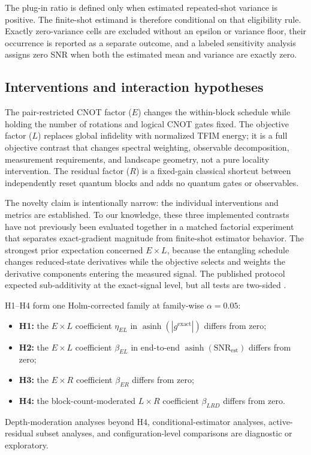 \documentclass[pdflatex,sn-basic,Numbered]{sn-jnl}
\newcommand{\snrest}{\mathrm{SNR}_{\mathrm{est}}}
\begin{document}
The plug-in ratio is defined only when estimated repeated-shot variance is positive. The finite-shot estimand is therefore conditional on that eligibility rule. Exactly zero-variance cells are excluded without an epsilon or variance floor, their occurrence is reported as a separate outcome, and a labeled sensitivity analysis assigns zero SNR when both the estimated mean and variance are exactly zero.

\subsection{Interventions and interaction hypotheses}

The pair-restricted CNOT factor ($E$) changes the within-block schedule while holding the number of rotations and logical CNOT gates fixed. The objective factor ($L$) replaces global infidelity with normalized TFIM energy; it is a full objective contrast that changes spectral weighting, observable decomposition, measurement requirements, and landscape geometry, not a pure locality intervention. The residual factor ($R$) is a fixed-gain classical shortcut between independently reset quantum blocks and adds no quantum gates or observables.

The novelty claim is intentionally narrow: the individual interventions and metrics are established. To our knowledge, these three implemented contrasts have not previously been evaluated together in a matched factorial experiment that separates exact-gradient magnitude from finite-shot estimator behavior. The strongest prior expectation concerned $E\times L$, because the entangling schedule changes reduced-state derivatives while the objective selects and weights the derivative components entering the measured signal. The published protocol expected sub-additivity at the exact-signal level, but all tests are two-sided \cite{shen2026gradient}.

H1--H4 form one Holm-corrected family at family-wise $\alpha=0.05$:
\begin{itemize}
\item \textbf{H1:} the $E\times L$ coefficient $\eta_{EL}$ in $\operatorname{asinh}(|g^{\mathrm{exact}}|)$ differs from zero;
\item \textbf{H2:} the $E\times L$ coefficient $\beta_{EL}$ in end-to-end $\operatorname{asinh}(\snrest)$ differs from zero;
\item \textbf{H3:} the $E\times R$ coefficient $\beta_{ER}$ differs from zero;
\item \textbf{H4:} the block-count-moderated $L\times R$ coefficient $\beta_{LRD}$ differs from zero.
\end{itemize}
Depth-moderation analyses beyond H4, conditional-estimator analyses, active-residual subset analyses, and configuration-level comparisons are diagnostic or exploratory.
\end{document}
